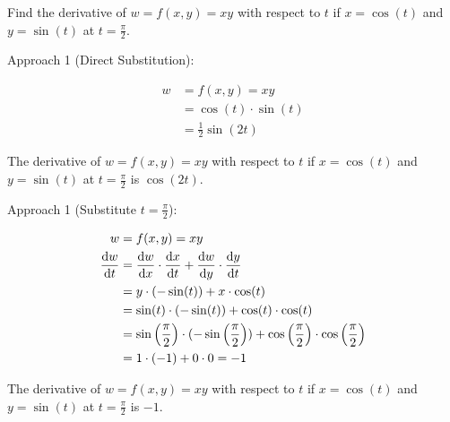 \documentclass{article}
\begin{document}
\begin{examplebox}
    Find the derivative of \( w = f(x, y) = xy \) with respect to \( t \) if \( x = \cos(t) \) and \( y = \sin(t) \) at \( t = \frac{\pi}{2} \).

    Approach 1 (Direct Substitution):
    \begin{solutionbox}
        \begin{align*}
            w &= f(x, y) = xy \\
            &= \cos(t) \cdot \sin(t) \\
            &= \frac{1}{2} \sin(2t)
        \end{align*}
        \begin{answerbox}
            The derivative of \( w = f(x, y) = xy \) with respect to \( t \) if \( x = \cos(t) \) and \( y = \sin(t) \) at \( t = \frac{\pi}{2} \) is \( \cos(2t) \).
        \end{answerbox}
    \end{solutionbox}

    Approach 1 (Substitute \( t = \frac{\pi}{2} \)):
    \begin{solutionbox}
        \begin{align*}
            w &= f(x, y) = xy \\
            \dv{w}{t} &= \dv{w}{x} \cdot \dv{x}{t} + \dv{w}{y} \cdot \dv{y}{t} \\
            &= y \cdot (-\sin(t)) + x \cdot \cos(t) \\
            &= \sin(t) \cdot (-\sin(t)) + \cos(t) \cdot \cos(t) \\
            &= \sin\left(\frac{\pi}{2}\right) \cdot (-\sin\left(\frac{\pi}{2}\right)) + \cos\left(\frac{\pi}{2}\right) \cdot \cos\left(\frac{\pi}{2}\right) \\
            &= 1 \cdot (-1) + 0 \cdot 0 = -1
        \end{align*}
        \begin{answerbox}
            The derivative of \( w = f(x, y) = xy \) with respect to \( t \) if \( x = \cos(t) \) and \( y = \sin(t) \) at \( t = \frac{\pi}{2} \) is \( -1 \).
        \end{answerbox}
    \end{solutionbox}
\end{examplebox}
\end{document}
